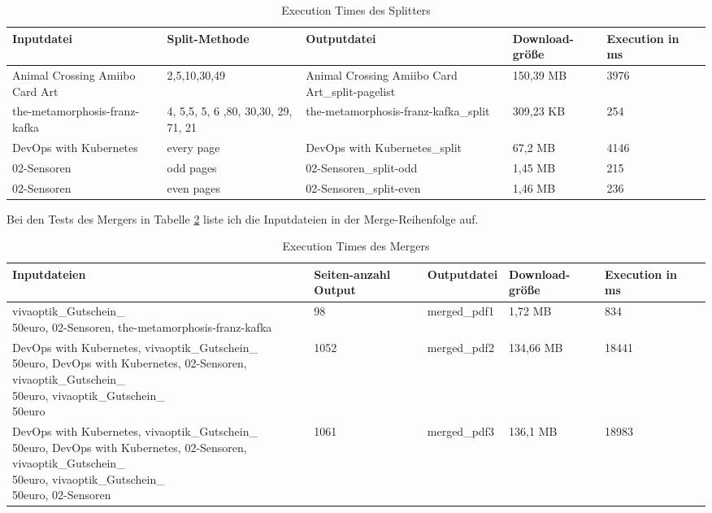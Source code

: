 \begin{table}[!htbp]
	\centering
	\begin{tabular}{|p{2.5cm}|p{3cm}|p{3cm}|p{2cm}|p{2cm}|p{2cm}|}
		\hline
		\textbf{Inputdatei}					& \textbf{Split-Methode}					& \textbf{Outputdatei}								& \textbf{Download-größe}	& \textbf{Execution in ms} 	\\ 
		\hline
		Animal Crossing Amiibo Card Art		& 2,5,10,30,49 								& Animal Crossing Amiibo Card Art\_split-pagelist 	& 150,39 MB					& 3976  						\\
		the-metamorphosis-franz-kafka		& 4, 5,5, 5, 6 ,80, 30,30, 29, 71, 21 		& the-metamorphosis-franz-kafka\_split 				& 309,23 KB				
											& 254  			\\
		DevOps with Kubernetes				& every page								& DevOps with Kubernetes\_split 					& 67,2 MB					& 4146  						\\
		02-Sensoren							& odd pages 								& 02-Sensoren\_split-odd 							& 1,45 MB					& 215  							\\
		02-Sensoren							& even pages								& 02-Sensoren\_split-even 							& 1,46 MB					& 236 							\\
		\hline
	\end{tabular}
	\caption{Execution Times des Splitters}
	\label{table:splitter-dur}
\end{table}

Bei den Tests des Mergers in Tabelle \ref{table:merger-dur} liste ich die Inputdateien in der Merge-Reihenfolge auf.

\begin{table}[!htbp]
	\centering
	\begin{tabular}{|p{4cm}|p{1.7cm}|p{2.3cm}|p{2cm}|p{2cm}|p{2cm}|}
		\hline
		\textbf{Inputdateien}	& \textbf{Seiten-anzahl Output}		& \textbf{Outputdatei}		& \textbf{Download-größe}	& \textbf{Execution in ms} 	\\ 
		\hline
		\parbox[t]{4cm}{vivaoptik\_Gutschein\_\\50euro,} 02-Sensoren, the-metamorphosis-franz-kafka	& 98 & merged\_pdf1 & 1,72 MB		& 834  					\\
		
		DevOps with Kubernetes, \parbox[t]{4cm}{vivaoptik\_Gutschein\_\\50euro,} DevOps with Kubernetes, 02-Sensoren, \parbox[t]{4cm}{vivaoptik\_Gutschein\_\\50euro,} \parbox[t]{4cm}{vivaoptik\_Gutschein\_\\50euro}		& 1052 		& merged\_pdf2		& 134,66 MB		& 18441   						\\
		
		DevOps with Kubernetes, \parbox[t]{4cm}{vivaoptik\_Gutschein\_\\50euro,} DevOps with Kubernetes, 02-Sensoren, \parbox[t]{4cm}{vivaoptik\_Gutschein\_\\50euro,} \parbox[t]{4cm}{vivaoptik\_Gutschein\_\\50euro,} 02-Sensoren		& 1061 		& merged\_pdf3				& 136,1 MB					& 18983   						\\
		\hline
	\end{tabular}
	\caption{Execution Times des Mergers}
	\label{table:merger-dur}
\end{table}

